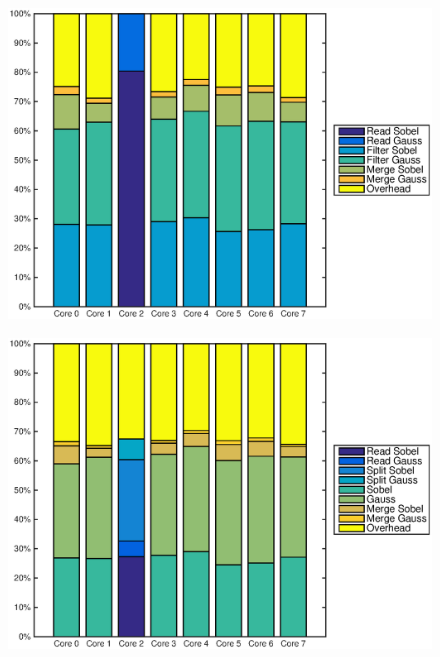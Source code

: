 \begin{figure}
    \centering
    \begin{minipage}{0.45\textwidth}
        \centering
        \includegraphics[width=0.99\linewidth]{images/openem_sobel4cif_gausscif_eo.eps}
    \end{minipage}
    \hfill
    \begin{minipage}{0.45\textwidth}
        \centering
        \includegraphics[width=0.99\linewidth]{images/openem_sobel4cif_gausscif_func.eps}
        \label{fig:oem8corefuncsobel4cif}
    \end{minipage}%
\end{figure}
